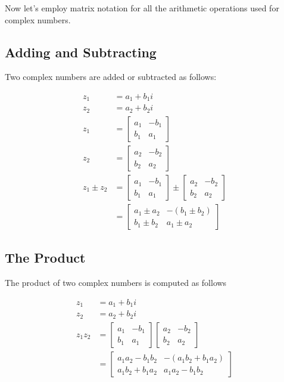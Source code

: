 Now let's employ matrix notation for all the arithmetic operations used for complex numbers.

\subsection{Adding and Subtracting}
Two complex numbers are added or subtracted as follows:

$$
\begin{aligned}
z_{1} & =a_{1}+b_{1} i \\
z_{2} & =a_{2}+b_{2} i \\
z_{1} & =\left[\begin{array}{cc}
a_{1} & -b_{1} \\
b_{1} & a_{1}
\end{array}\right] \\
z_{2} & =\left[\begin{array}{ll}
a_{2} & -b_{2} \\
b_{2} & a_{2}
\end{array}\right] \\
z_{1} \pm z_{2} & =\left[\begin{array}{ll}
a_{1} & -b_{1} \\
b_{1} & a_{1}
\end{array}\right] \pm\left[\begin{array}{ll}
a_{2} & -b_{2} \\
b_{2} & a_{2}
\end{array}\right] \\
& =\left[\begin{array}{ll}
a_{1} \pm a_{2} & -\left(b_{1} \pm b_{2}\right) \\
b_{1} \pm b_{2} & a_{1} \pm a_{2}
\end{array}\right]
\end{aligned}
$$

\subsection{The Product}
The product of two complex numbers is computed as follows

$$
\begin{aligned}
z_{1} & =a_{1}+b_{1} i \\
z_{2} & =a_{2}+b_{2} i \\
z_{1} z_{2} & =\left[\begin{array}{cc}
a_{1} & -b_{1} \\
b_{1} & a_{1}
\end{array}\right]\left[\begin{array}{cc}
a_{2} & -b_{2} \\
b_{2} & a_{2}
\end{array}\right] \\
& =\left[\begin{array}{cc}
a_{1} a_{2}-b_{1} b_{2} & -\left(a_{1} b_{2}+b_{1} a_{2}\right) \\
a_{1} b_{2}+b_{1} a_{2} & a_{1} a_{2}-b_{1} b_{2}
\end{array}\right]
\end{aligned}
$$

